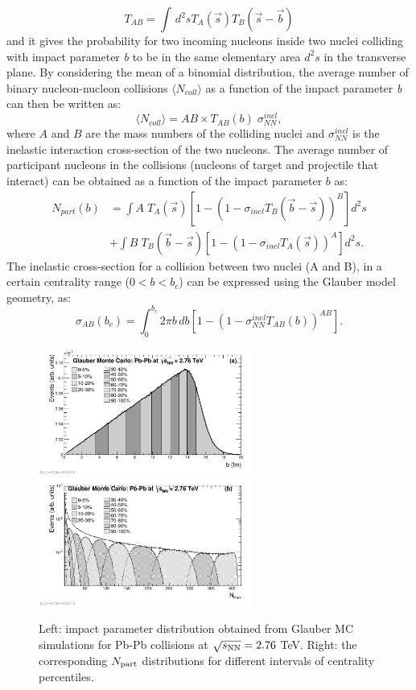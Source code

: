 \begin{equation}
T_{AB} = \int \,d^2s T_A(\vec s)T_B(\vec s - \vec b)
\end{equation}
and it gives the probability for two incoming nucleons inside two nuclei colliding 
with impact parameter \textit{b} to be in the same elementary area $d^2s$ in the transverse plane.
By considering the mean of a binomial distribution, the average number of 
binary nucleon-nucleon collisions $\langle N_{coll}\rangle$ as a function 
of the impact parameter \textit{b} can then be written as:
\begin{equation}
\langle N_{coll}\rangle = AB \times T_{AB}(b)\; \sigma^{inel}_{NN},
\end{equation}
where $A$ and $B$ are the mass numbers of the colliding nuclei and $\sigma^{inel}_{NN}$
is the inelastic interaction cross-section of the two nucleons.
The average number of participant nucleons in the collisions (nucleons of target 
and projectile that interact) can be obtained as a function of the impact parameter $b$ as:
\begin{equation}
\begin{aligned}
N_{part} (b) &= \int A \; T_A(\vec{s}) [1- (1- \sigma_{inel} T_B(\vec{b}-\vec{s}))^B]d^2s \\
& + \int B \; T_B(\vec{b}-\vec{s}) [1- (1- \sigma_{inel} T_A(\vec{s}))^A]d^2s.
\end{aligned}
\end{equation}
The inelastic cross-section for a collision between two nuclei (A and B), 
in a certain centrality range ($0 < b < b_c$) 
can be expressed using the Glauber model geometry, as:
\begin{equation}
\label{eq:sigmaABGlauber}
\sigma_{AB}(b_c) = \int_0^{b_c} 2\pi b\,db [1 - (1 - \sigma^{inel}_{NN}T_{AB}(b))^{AB}]. %
\end{equation}
\begin{figure}[!t]
\centering
\includegraphics[width=7cm]{FigCap1/Glauberimpactpar.pdf}
\includegraphics[width=7cm]{FigCap1/GlauberNpart.pdf}
\caption{Left: impact parameter distribution obtained from Glauber MC simulations for Pb-Pb collisions at $\sqrt{s_{\rm NN}} = 2.76$ TeV. Right: the corresponding $N_{\rm part}$ distributions for different intervals of centrality percentiles.}
\label{fig:glaubMC}
\end{figure}
